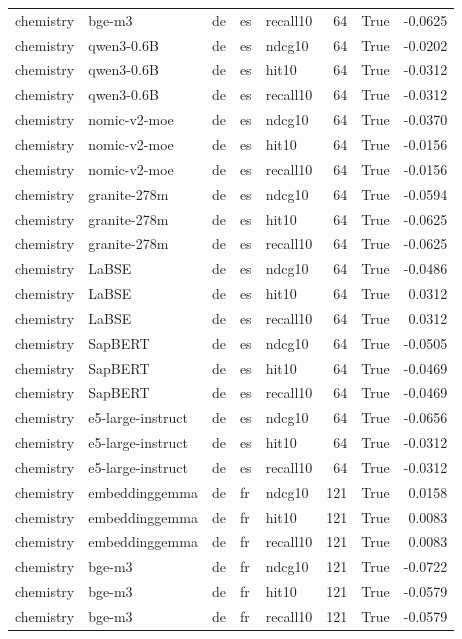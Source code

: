 \begin{tabular}{lllllrrr}
chemistry & bge-m3 & de & es & recall10 & 64 & True & -0.0625 \\
chemistry & qwen3-0.6B & de & es & ndcg10 & 64 & True & -0.0202 \\
chemistry & qwen3-0.6B & de & es & hit10 & 64 & True & -0.0312 \\
chemistry & qwen3-0.6B & de & es & recall10 & 64 & True & -0.0312 \\
chemistry & nomic-v2-moe & de & es & ndcg10 & 64 & True & -0.0370 \\
chemistry & nomic-v2-moe & de & es & hit10 & 64 & True & -0.0156 \\
chemistry & nomic-v2-moe & de & es & recall10 & 64 & True & -0.0156 \\
chemistry & granite-278m & de & es & ndcg10 & 64 & True & -0.0594 \\
chemistry & granite-278m & de & es & hit10 & 64 & True & -0.0625 \\
chemistry & granite-278m & de & es & recall10 & 64 & True & -0.0625 \\
chemistry & LaBSE & de & es & ndcg10 & 64 & True & -0.0486 \\
chemistry & LaBSE & de & es & hit10 & 64 & True & 0.0312 \\
chemistry & LaBSE & de & es & recall10 & 64 & True & 0.0312 \\
chemistry & SapBERT & de & es & ndcg10 & 64 & True & -0.0505 \\
chemistry & SapBERT & de & es & hit10 & 64 & True & -0.0469 \\
chemistry & SapBERT & de & es & recall10 & 64 & True & -0.0469 \\
chemistry & e5-large-instruct & de & es & ndcg10 & 64 & True & -0.0656 \\
chemistry & e5-large-instruct & de & es & hit10 & 64 & True & -0.0312 \\
chemistry & e5-large-instruct & de & es & recall10 & 64 & True & -0.0312 \\
chemistry & embeddinggemma & de & fr & ndcg10 & 121 & True & 0.0158 \\
chemistry & embeddinggemma & de & fr & hit10 & 121 & True & 0.0083 \\
chemistry & embeddinggemma & de & fr & recall10 & 121 & True & 0.0083 \\
chemistry & bge-m3 & de & fr & ndcg10 & 121 & True & -0.0722 \\
chemistry & bge-m3 & de & fr & hit10 & 121 & True & -0.0579 \\
chemistry & bge-m3 & de & fr & recall10 & 121 & True & -0.0579 \\

\end{tabular}
